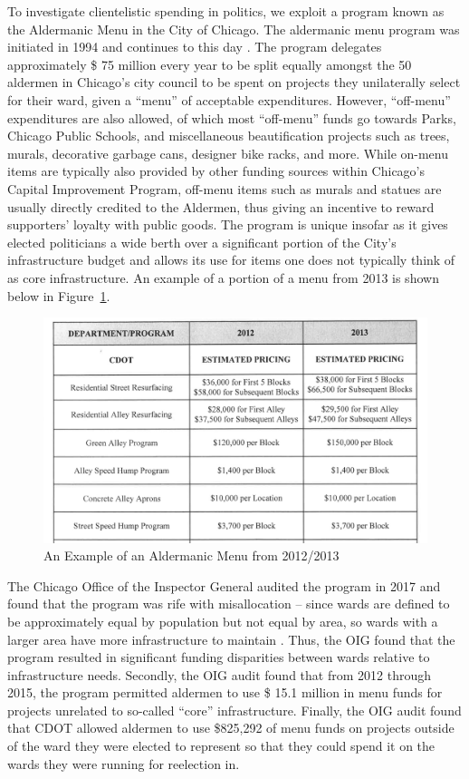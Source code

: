 To investigate clientelistic spending in politics, we exploit a program known as the Aldermanic Menu in the City of Chicago. 
The aldermanic menu program was initiated in 1994 and continues to this day \cite{OIGaudit}. 
The program delegates approximately \$ 75 million every year to be split equally amongst the 50 aldermen in Chicago's city council to be spent on projects they unilaterally select for their ward, given a ``menu'' of acceptable expenditures. 
However, ``off-menu'' expenditures are also allowed, of which most ``off-menu'' funds go towards Parks, Chicago Public Schools, and miscellaneous beautification projects such as trees, murals, decorative garbage cans, designer bike racks, and more\cite{OIGaudit}. 
While on-menu items are typically also provided by other funding sources within Chicago's Capital Improvement Program, off-menu items such as murals and statues are usually directly credited to the Aldermen, thus giving an incentive to reward supporters' loyalty with public goods.
The program is unique insofar as it gives elected politicians a wide berth over a significant portion of the City's infrastructure budget and allows its use for items one does not typically think of as core infrastructure. 
An example of a portion of a menu from 2013 is shown below in Figure~\ref*{fig:menu_example}.


\begin{figure}[H]
    \centering
    \caption{An Example of an Aldermanic Menu from 2012/2013}\label{fig:menu_example}
    \includegraphics[scale=0.38]{input/menu_example.png}
\end{figure}

The Chicago Office of the Inspector General audited the program in 2017 and found that the program was rife with misallocation -- since wards are defined to be approximately equal by population but not equal by area, so wards with a larger area have more infrastructure to maintain \cite{OIGaudit}.
Thus, the OIG found that the program resulted in significant funding disparities between wards relative to infrastructure needs.
Secondly, the OIG audit found that from 2012 through 2015, the program permitted aldermen to use \$ 15.1 million in menu funds for projects unrelated to so-called ``core'' infrastructure.
Finally, the OIG audit found that CDOT allowed aldermen to use \$825,292 of menu funds on projects outside of the ward they were elected to represent so that they could spend it on the wards they were running for reelection in.

